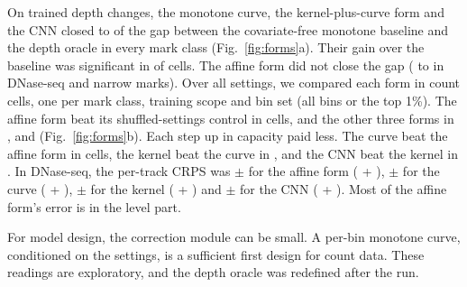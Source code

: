 \documentclass[pdflatex,sn-mathphys-num]{sn-jnl}
\newcommand{\lit}[1]{#1}
\begin{document}
On trained depth changes, the monotone curve, the kernel-plus-curve form and the CNN closed
\gcBDLo{} to \gcBDHi{} of the gap between the covariate-free monotone baseline and the depth
oracle in every mark class (Fig.~\ref{fig:forms}a). Their gain over the baseline was
significant in \nBDgain{} of \nBDcells{} cells. The affine form did not close the gap
(\gcALo{} to \gcAHi{} in DNase-seq and narrow marks). Over all settings, we compared each form
in \nCellsB{} count cells, one per mark class, training scope and bin set (all bins or the top
\lit{1}\%). The affine form beat its shuffled-settings control in \nTwA{} cells, and the other
three forms in \nTwB{}, \nTwC{} and \nTwD{} (Fig.~\ref{fig:forms}b). Each step up in capacity
paid less. The curve beat the affine form in \nBlB{} cells, the kernel beat the curve in
\nBlC{}, and the CNN beat the kernel in \nBlD{}. In DNase-seq, the per-track CRPS was \dnA{}
$\pm$ \dnAS{} for the affine form (\dnAOS{} + \dnASE{}), \dnB{} $\pm$ \dnBS{} for the curve
(\dnBOS{} + \dnBSE{}), \dnC{} $\pm$ \dnCS{} for the kernel (\dnCOS{} + \dnCSE{}) and \dnD{} $\pm$
\dnDS{} for the CNN (\dnDOS{} + \dnDSE{}). Most of the affine form's error is in the level part.

For model design, the correction module can be small. A per-bin monotone curve, conditioned
on the settings, is a sufficient first design for count data. These readings are exploratory,
and the depth oracle was redefined after the run.
\end{document}
